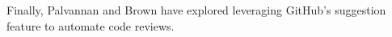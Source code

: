 Finally, Palvannan and Brown \cite{palvannan2023suggestion} have explored leveraging GitHub’s suggestion feature to automate code reviews.

